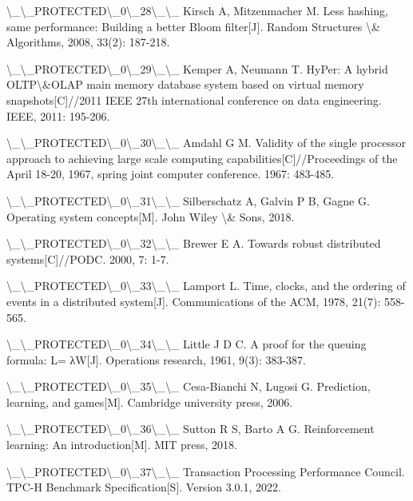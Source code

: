 \textbackslash{}_\textbackslash{}_PROTECTED\textbackslash{}_0\textbackslash{}_28\textbackslash{}_\textbackslash{}_ Kirsch A, Mitzenmacher M. Less hashing, same performance: Building a better Bloom filter[J]. Random Structures \textbackslash{}& Algorithms, 2008, 33(2): 187-218.

\textbackslash{}_\textbackslash{}_PROTECTED\textbackslash{}_0\textbackslash{}_29\textbackslash{}_\textbackslash{}_ Kemper A, Neumann T. HyPer: A hybrid OLTP\textbackslash{}&OLAP main memory database system based on virtual memory snapshots[C]//2011 IEEE 27th international conference on data engineering. IEEE, 2011: 195-206.

\textbackslash{}_\textbackslash{}_PROTECTED\textbackslash{}_0\textbackslash{}_30\textbackslash{}_\textbackslash{}_ Amdahl G M. Validity of the single processor approach to achieving large scale computing capabilities[C]//Proceedings of the April 18-20, 1967, spring joint computer conference. 1967: 483-485.

\textbackslash{}_\textbackslash{}_PROTECTED\textbackslash{}_0\textbackslash{}_31\textbackslash{}_\textbackslash{}_ Silberschatz A, Galvin P B, Gagne G. Operating system concepts[M]. John Wiley \textbackslash{}& Sons, 2018.

\textbackslash{}_\textbackslash{}_PROTECTED\textbackslash{}_0\textbackslash{}_32\textbackslash{}_\textbackslash{}_ Brewer E A. Towards robust distributed systems[C]//PODC. 2000, 7: 1-7.

\textbackslash{}_\textbackslash{}_PROTECTED\textbackslash{}_0\textbackslash{}_33\textbackslash{}_\textbackslash{}_ Lamport L. Time, clocks, and the ordering of events in a distributed system[J]. Communications of the ACM, 1978, 21(7): 558-565.

\textbackslash{}_\textbackslash{}_PROTECTED\textbackslash{}_0\textbackslash{}_34\textbackslash{}_\textbackslash{}_ Little J D C. A proof for the queuing formula: L= λW[J]. Operations research, 1961, 9(3): 383-387.

\textbackslash{}_\textbackslash{}_PROTECTED\textbackslash{}_0\textbackslash{}_35\textbackslash{}_\textbackslash{}_ Cesa-Bianchi N, Lugosi G. Prediction, learning, and games[M]. Cambridge university press, 2006.

\textbackslash{}_\textbackslash{}_PROTECTED\textbackslash{}_0\textbackslash{}_36\textbackslash{}_\textbackslash{}_ Sutton R S, Barto A G. Reinforcement learning: An introduction[M]. MIT press, 2018.

\textbackslash{}_\textbackslash{}_PROTECTED\textbackslash{}_0\textbackslash{}_37\textbackslash{}_\textbackslash{}_ Transaction Processing Performance Council. TPC-H Benchmark Specification[S]. Version 3.0.1, 2022.

